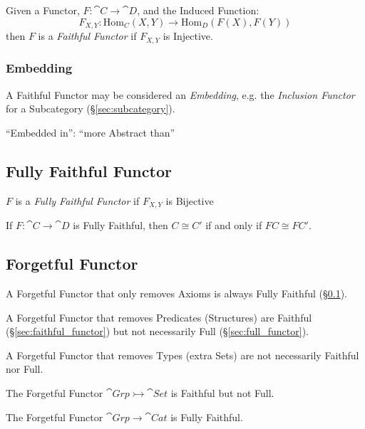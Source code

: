 Given a Functor, $F : \cat{C} \rightarrow \cat{D}$, and the
Induced Function:
\[
  F_{X,Y} : \mathrm{Hom}_C(X,Y) \rightarrow \mathrm{Hom}_D(F(X),F(Y))
\]
then $F$ is a \emph{Faithful Functor} if $F_{X,Y}$ is Injective.



\subsubsection{Embedding}\label{sec:category_embedding}

A Faithful Functor may be considered an \emph{Embedding}, e.g. the
\emph{Inclusion Functor} for a Subcategory
(\S\ref{sec:subcategory}).

``Embedded in'': ``more Abstract than''



\subsection{Fully Faithful Functor}\label{sec:fully_faithful}

$F$ is a \emph{Fully Faithful Functor} if $F_{X,Y}$ is Bijective

If $F : \cat{C} \rightarrow \cat{D}$ is Fully Faithful, then $C
\cong C'$ if and only if $FC \cong FC'$.



\subsection{Forgetful Functor}\label{sec:forgetful_functor}

A Forgetful Functor that only removes Axioms is always Fully Faithful
(\S\ref{sec:fully_faithful}).

A Forgetful Functor that removes Predicates (Structures) are Faithful
(\S\ref{sec:faithful_functor}) but not necessarily Full
(\S\ref{sec:full_functor}).

A Forgetful Functor that removes Types (extra Sets) are not
necessarily Faithful nor Full.

The Forgetful Functor $\cat{Grp} \rightarrowtail \cat{Set}$ is
Faithful but not Full.

The Forgetful Functor $\cat{Grp} \rightarrow \cat{Cat}$ is
Fully Faithful.

